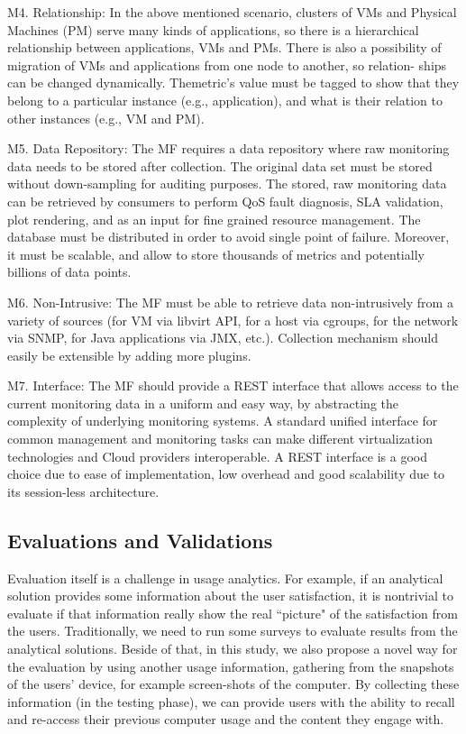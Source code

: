 M4. Relationship: In the above mentioned scenario, clusters of VMs and Physical Machines (PM) serve many kinds of applications, so there is a hierarchical relationship between applications, VMs and PMs.
There is also a possibility of migration of VMs and applications from one node to another, so relation- ships can be changed dynamically. Themetric’s value must be tagged to show that they belong to a particular instance (e.g., application), and what is their relation to other instances (e.g., VM and PM). 

M5. Data Repository: The MF requires a data repository where raw monitoring data needs to be stored after collection. The original data set must be stored without down-sampling for auditing purposes. The stored, raw monitoring data can be retrieved by consumers to perform QoS fault diagnosis, SLA validation, plot rendering, and as an input for fine grained resource management. The database must be distributed in order to avoid single point of failure. Moreover, it must be scalable, and allow to store thousands of metrics and potentially billions of data points. 

M6. Non-Intrusive: The MF must be able to retrieve data non-intrusively from a variety of sources (for VM via libvirt API, for a host via cgroups, for the network via SNMP, for Java applications via JMX, etc.). Collection mechanism should easily be extensible by adding more plugins. 

M7. Interface: The MF should provide a REST interface that allows access to the current monitoring data in a uniform and easy way, by abstracting the complexity of underlying monitoring systems. A standard unified interface for common management and monitoring tasks can make different virtualization technologies and Cloud providers interoperable. A REST interface is a good choice due to ease of implementation, low overhead and good scalability due to its session-less architecture.

\subsection{Evaluations and Validations}
Evaluation itself is a challenge in usage analytics. For example, if an analytical solution provides some information about the user satisfaction, it is nontrivial to evaluate if that information really show the real ``picture" of the satisfaction from the users. Traditionally, we need to run some surveys to evaluate results from the analytical solutions. Beside of that, in this study, we also propose a novel way for the evaluation by using another usage information, gathering from the snapshots of the users' device, for example screen-shots of the computer. By collecting these information (in the testing phase), we can provide users with the ability to recall and re-access their previous computer usage and the content they engage with. 